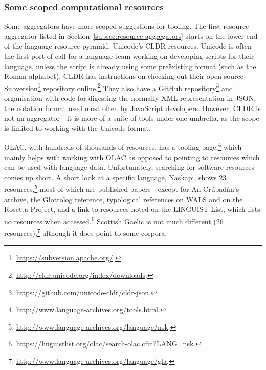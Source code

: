 \subsubsection{Some scoped computational resources}

Some aggregators have more scoped suggestions for tooling. The first resource aggregator listed in Section~\ref{subsec:resource-aggregators} starts on the lower end of the language resource pyramid: Unicode's CLDR resources. Unicode is often the first port-of-call for a language team working on developing scripts for their language, unless the script is already using some  pre\"{e}xisting format (such as the Roman alphabet). CLDR has instructions on checking out their open source Subversion\footnote{\href{https://subversion.apache.org/}{https://subversion.apache.org/}. } repository online.\footnote{\href{http://cldr.unicode.org/index/downloads}{http://cldr.unicode.org/index/downloads}. } They also have a GitHub repository\footnote{\href{https://github.com/unicode-cldr/cldr-json}{https://github.com/unicode-cldr/cldr-json}. } and organisation with code for digesting the normally XML representation in JSON, the notation format used most often by JavaScript developers. However, CLDR is not an aggregator - it is more of a suite of tools under one umbrella, as the scope is limited to working with the Unicode format.

OLAC, with hundreds of thousands of resources, has a tooling page,\footnote{\href{http://www.language-archives.org/tools.html}{http://www.language-archives.org/tools.html}. } which mainly helps with working with OLAC as opposed to pointing to resources which can be used with language data. Unfortunately, searching for software resources comes up short. A short look at a specific language, Nask\-api, shows 23 resources,\footnote{\href{http://www.language-archives.org/language/nsk}{http://www.language-archives.org/language/nsk}. } most of which are published papers - except for An Cr\'ubad\'an's archive, the Glottolog reference, typological references on WALS and on the Rosetta Project, and a link to resources noted on the LINGUIST List, which lists no resources when accessed.\footnote{\href{https://linguistlist.org/olac/search-olac.cfm?LANG=nsk}{https://linguistlist.org/olac/search-olac.cfm?LANG=nsk}. } Scottish Gaelic is not much different (26 resources),\footnote{\href{http://www.language-archives.org/language/gla}{http://www.language-archives.org/language/gla}. } although it does point to some corpora.

